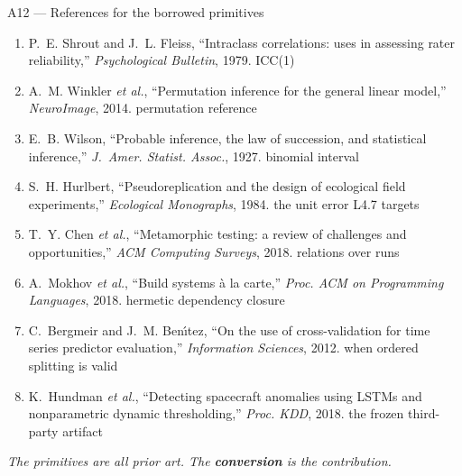 \documentclass[aspectratio=169,11pt]{beamer}
\begin{document}
\begin{frame}{A12 --- References for the borrowed primitives}
  \scriptsize
  \begin{enumerate}\setlength{\itemsep}{0.1em}\setlength{\parskip}{0pt}
    \item P.~E. Shrout and J.~L. Fleiss, ``Intraclass correlations: uses in assessing rater
      reliability,'' \emph{Psychological Bulletin}, 1979. \hfill{\scriptsize ICC(1)}
    \item A.~M. Winkler \emph{et al.}, ``Permutation inference for the general linear model,''
      \emph{NeuroImage}, 2014. \hfill{\scriptsize permutation reference}
    \item E.~B. Wilson, ``Probable inference, the law of succession, and statistical inference,''
      \emph{J.~Amer. Statist. Assoc.}, 1927. \hfill{\scriptsize binomial interval}
    \item S.~H. Hurlbert, ``Pseudoreplication and the design of ecological field experiments,''
      \emph{Ecological Monographs}, 1984. \hfill{\scriptsize the unit error L4.7 targets}
    \item T.~Y. Chen \emph{et al.}, ``Metamorphic testing: a review of challenges and
      opportunities,'' \emph{ACM Computing Surveys}, 2018. \hfill{\scriptsize relations over runs}
    \item A.~Mokhov \emph{et al.}, ``Build systems \`a la carte,'' \emph{Proc. ACM on Programming
      Languages}, 2018. \hfill{\scriptsize hermetic dependency closure}
    \item C.~Bergmeir and J.~M. Ben\'{\i}tez, ``On the use of cross-validation for time series
      predictor evaluation,'' \emph{Information Sciences}, 2012.
      \hfill{\scriptsize when ordered splitting is valid}
    \item K.~Hundman \emph{et al.}, ``Detecting spacecraft anomalies using LSTMs and nonparametric
      dynamic thresholding,'' \emph{Proc. KDD}, 2018. \hfill{\scriptsize the frozen third-party artifact}
  \end{enumerate}
  {\scriptsize\itshape\color{black!70}The primitives are all prior art. The \textbf{conversion} is the contribution.}
\end{frame}
\end{document}
